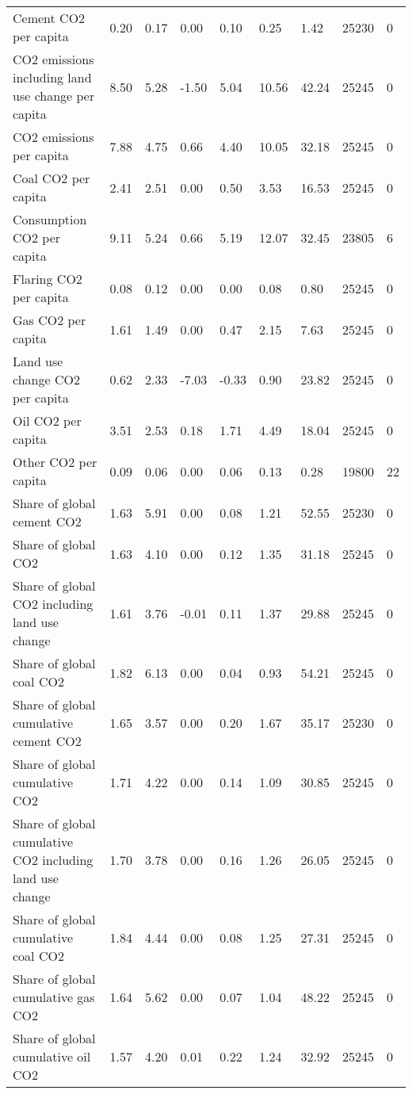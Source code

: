 \begin{longtable}{lllllllll}
Cement CO2 per capita & 0.20 & 0.17 & 0.00 & 0.10 & 0.25 & 1.42 & 25230 & 0\\
CO2 emissions including land use change per capita & 8.50 & 5.28 & -1.50 & 5.04 & 10.56 & 42.24 & 25245 & 0\\
CO2 emissions per capita & 7.88 & 4.75 & 0.66 & 4.40 & 10.05 & 32.18 & 25245 & 0\\
Coal CO2 per capita & 2.41 & 2.51 & 0.00 & 0.50 & 3.53 & 16.53 & 25245 & 0\\
\addlinespace
Consumption CO2 per capita & 9.11 & 5.24 & 0.66 & 5.19 & 12.07 & 32.45 & 23805 & 6\\
Flaring CO2 per capita & 0.08 & 0.12 & 0.00 & 0.00 & 0.08 & 0.80 & 25245 & 0\\
Gas CO2 per capita & 1.61 & 1.49 & 0.00 & 0.47 & 2.15 & 7.63 & 25245 & 0\\
Land use change CO2 per capita & 0.62 & 2.33 & -7.03 & -0.33 & 0.90 & 23.82 & 25245 & 0\\
Oil CO2 per capita & 3.51 & 2.53 & 0.18 & 1.71 & 4.49 & 18.04 & 25245 & 0\\
\addlinespace
Other CO2 per capita & 0.09 & 0.06 & 0.00 & 0.06 & 0.13 & 0.28 & 19800 & 22\\
Share of global cement CO2 & 1.63 & 5.91 & 0.00 & 0.08 & 1.21 & 52.55 & 25230 & 0\\
Share of global CO2 & 1.63 & 4.10 & 0.00 & 0.12 & 1.35 & 31.18 & 25245 & 0\\
Share of global CO2 including land use change & 1.61 & 3.76 & -0.01 & 0.11 & 1.37 & 29.88 & 25245 & 0\\
Share of global coal CO2 & 1.82 & 6.13 & 0.00 & 0.04 & 0.93 & 54.21 & 25245 & 0\\
\addlinespace
Share of global cumulative cement CO2 & 1.65 & 3.57 & 0.00 & 0.20 & 1.67 & 35.17 & 25230 & 0\\
Share of global cumulative CO2 & 1.71 & 4.22 & 0.00 & 0.14 & 1.09 & 30.85 & 25245 & 0\\
Share of global cumulative CO2 including land use change & 1.70 & 3.78 & 0.00 & 0.16 & 1.26 & 26.05 & 25245 & 0\\
Share of global cumulative coal CO2 & 1.84 & 4.44 & 0.00 & 0.08 & 1.25 & 27.31 & 25245 & 0\\
Share of global cumulative gas CO2 & 1.64 & 5.62 & 0.00 & 0.07 & 1.04 & 48.22 & 25245 & 0\\
\addlinespace
Share of global cumulative oil CO2 & 1.57 & 4.20 & 0.01 & 0.22 & 1.24 & 32.92 & 25245 & 0\\

\end{longtable}
